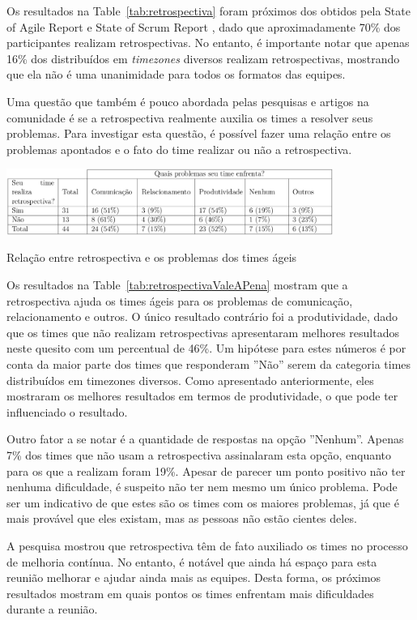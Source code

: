 \documentclass[12pt]{article}
\begin{document}
Os resultados na Table~\ref{tab:retrospectiva} foram próximos dos obtidos pela State of Agile Report \cite{version:15} e State of Scrum Report \cite{scrum:15}, dado que aproximadamente 70\% dos participantes realizam retrospectivas. No entanto, é importante notar que apenas 16\% dos distribuídos em \textit{timezones} diversos realizam retrospectivas, mostrando que ela não é uma unanimidade para todos os formatos das equipes.

Uma questão que também é pouco abordada pelas pesquisas e artigos na comunidade é se a retrospectiva realmente auxilia os times a resolver seus problemas. Para investigar esta questão, é possível fazer uma relação entre os problemas apontados e o fato do time realizar ou não a retrospectiva.

\begin{table}[ht]
\centering
\includegraphics[width=0.8\textwidth]{retrospectivaValeAPena.png}
\caption{Relação entre retrospectiva e os problemas dos times ágeis}
\label{tab:retrospectivaValeAPena}
\end{table}

Os resultados na Table~\ref{tab:retrospectivaValeAPena} mostram que a retrospectiva ajuda os times ágeis para os problemas de comunicação, relacionamento e outros. O único resultado contrário foi a produtividade, dado que os times que não realizam retrospectivas apresentaram melhores resultados neste quesito com um percentual de 46\%. Um hipótese para estes números é por conta da maior parte dos times que responderam ''Não'' serem da categoria times distribuídos em timezones diversos. Como apresentado anteriormente, eles mostraram os melhores resultados em termos de produtividade, o que pode ter influenciado o resultado.

Outro fator a se notar é a quantidade de respostas na opção  ''Nenhum''. Apenas 7\% dos times que não usam a retrospectiva assinalaram esta opção, enquanto para os que a realizam foram 19\%. Apesar de parecer um ponto positivo não ter nenhuma dificuldade, é suspeito não ter nem mesmo um único problema. Pode ser um indicativo de que estes são os times com os maiores problemas, já que é mais provável que eles existam, mas as pessoas não estão cientes deles.

A pesquisa mostrou que retrospectiva têm de fato auxiliado os times no processo de melhoria contínua. No entanto, é notável que ainda há espaço para esta reunião melhorar e ajudar ainda mais as equipes. Desta forma, os próximos resultados mostram em quais pontos os times enfrentam mais dificuldades durante a reunião.
\end{document}
